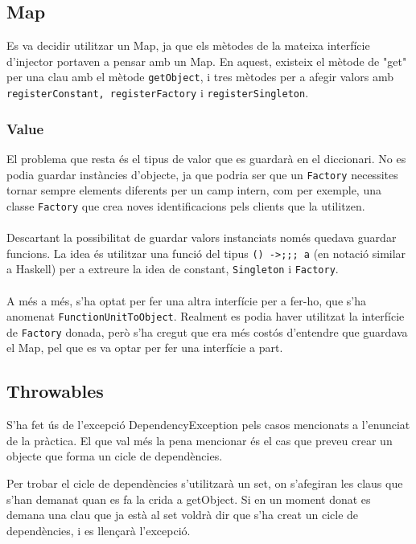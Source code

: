 
\subsection{Map}
Es va decidir utilitzar un Map, ja que els mètodes de la mateixa interfície d'injector portaven a pensar amb un Map. En aquest, existeix
el mètode de "get" per una clau amb el mètode \texttt{getObject}, i tres mètodes per a afegir valors
amb \texttt{registerConstant, registerFactory} i \texttt{registerSingleton}.
\subsubsection{Value}
El problema que resta és el tipus de valor que es guardarà en el diccionari. No es podia guardar instàncies d'objecte, ja que podria
ser que un \texttt{Factory} necessites tornar sempre elements diferents per un camp intern, com per exemple, una classe
\texttt{Factory} que crea noves identificacions pels clients que la utilitzen.\\
\\
Descartant la possibilitat de guardar valors instanciats només quedava guardar funcions. La idea és utilitzar una
funció del tipus \texttt{() ->;;; a} (en notació similar a Haskell) per a extreure
la idea de constant, \texttt{Singleton} i \texttt{Factory}.\\
\\
A més a més, s'ha optat per fer una altra interfície per a fer-ho, que s'ha anomenat \texttt{FunctionUnitToObject}. Realment
es podia haver utilitzat la interfície de \texttt{Factory} donada, però s'ha cregut que era més costós d'entendre que
guardava el Map, pel que es va optar per fer una interfície a part.
\subsection{Throwables}
S'ha fet ús de l'excepció DependencyException pels casos mencionats a l'enunciat
de la pràctica. El que val més la pena mencionar és el cas que preveu crear un objecte
que forma un cicle de dependències.

Per trobar el cicle de dependències s'utilitzarà un set, on s'afegiran
les claus que s'han demanat quan es fa la crida a getObject. Si en un moment
donat es demana una clau que ja està al set voldrà dir que s'ha creat un cicle
de dependències, i es llençarà l'excepció.
